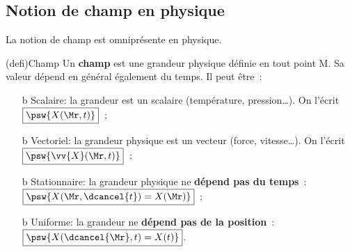 \documentclass[../../main/main.tex]{subfiles}
\begin{document}
\subsection{Notion de champ en physique}
La notion de champ est omniprésente en physique.
\begin{tcb}(defi){Champ}
	Un \textbf{champ} est une grandeur physique définie en tout point M. Sa
	valeur dépend en général également du temps. Il peut être~:
	\begin{itemize}
		\setlength{\fboxsep}{3mm}
		\item[b]{Scalaire}: la grandeur est un scalaire (température,
		pression…). On l'écrit $\boxed{\psw{X (\Mr,t)}}$~;
		\item[b]{Vectoriel}: la grandeur physique est un vecteur (force,
		vitesse…). On l'écrit $\boxed{\psw{\vv{X}(\Mr,t)}}$~;
		\item[b]{Stationnaire}: la grandeur physique ne \textbf{dépend pas du
			temps}~: $\boxed{\psw{X (\Mr,\dcancel{t}) = X(\Mr)}}$~;
		\item[b]{Uniforme}: la grandeur ne \textbf{dépend pas de la position}~:
		$\boxed{\psw{X (\dcancel{\Mr},t) = X(t)}}$.
	\end{itemize}
\end{tcb}
\end{document}
